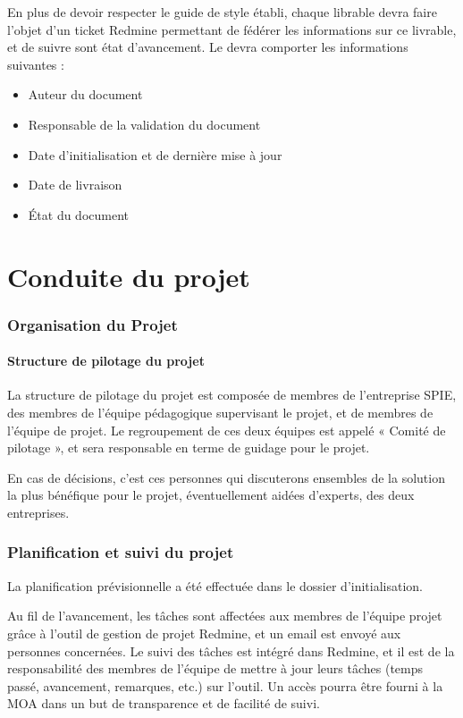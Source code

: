 \documentclass[a4paper, 18pt]{article}
\begin{document}
En plus de devoir respecter le guide de style établi, chaque librable devra faire l'objet d'un ticket Redmine permettant de fédérer les informations sur ce livrable, et de suivre sont état d'avancement. Le devra comporter les informations suivantes :

\begin{itemize}

\item Auteur du document
\item Responsable de la validation du document
\item Date d’initialisation et de dernière mise à jour
\item Date de livraison
\item État du document

\end{itemize}

\part{Conduite du projet}

\section{Organisation du Projet}

\subsection{Structure de pilotage du projet}

La structure de pilotage du projet est composée de membres de l'entreprise SPIE, des membres de l'équipe pédagogique supervisant le projet, et de membres de l'équipe de projet. Le regroupement de ces deux équipes est appelé « Comité de pilotage », et sera responsable en terme de guidage pour le projet.

En cas de décisions, c'est ces personnes qui discuterons ensembles de la solution la plus bénéfique pour le projet, éventuellement aidées d'experts, des deux entreprises.

\section{Planification et suivi du projet }

La planification prévisionnelle a été effectuée dans le dossier d'initialisation.

Au fil de l'avancement, les tâches sont affectées aux membres de l'équipe projet grâce à l'outil de gestion de projet Redmine, et un email est envoyé aux personnes concernées. Le suivi des tâches est intégré dans Redmine, et il est de la responsabilité des membres de l'équipe de mettre à jour leurs tâches (temps passé, avancement, remarques, etc.) sur l'outil. Un accès pourra être fourni à la MOA dans un but de transparence et de facilité de suivi.
\end{document}
